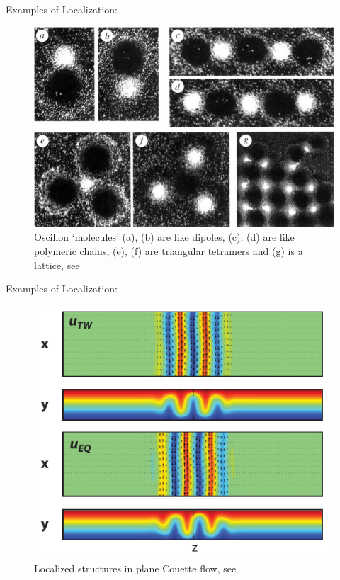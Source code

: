 \documentclass{beamer}
\begin{document}
\begin{frame}{Examples of Localization:}
\begin{figure}[ht]
  \centering
  \includegraphics[scale=0.4]
  {Figs/oscillon_molecules.png}  
  \caption{Oscillon `molecules' (a), (b) are like dipoles, (c), (d) are like polymeric chains, (e), (f) are triangular tetramers and (g) is a lattice, see \cite{umbanhowar1996localized}}
  \label{fig:oscillon_molecules}
\end{figure}
\end{frame}

\begin{frame}{Examples of Localization:}
\begin{figure}[ht]
  \centering
  \includegraphics[scale=0.8]
  {Figs/localized_pcf.png}  
  \caption{Localized structures in plane Couette flow, see \cite{schneider2010snakes}}
  \label{fig:localized_pcf}
\end{figure}
\end{frame}
\end{document}
